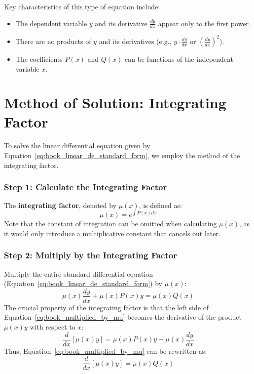 \documentclass[12pt, letterpaper]{book}
\begin{document}
Key characteristics of this type of equation include:
\begin{itemize}
    \item The dependent variable $y$ and its derivative $\frac{dy}{dx}$ appear only to the first power.
    \item There are no products of $y$ and its derivatives (e.g., $y \cdot \frac{dy}{dx}$ or $(\frac{dy}{dx})^2$).
    \item The coefficients $P(x)$ and $Q(x)$ can be functions of the independent variable $x$.
\end{itemize}

\section{Method of Solution: Integrating Factor}
\label{sec:book_integrating_factor}
To solve the linear differential equation given by Equation~\ref{eq:book_linear_de_standard_form}, we employ the method of the integrating factor.

\subsubsection{Step 1: Calculate the Integrating Factor}
The \textbf{integrating factor}, denoted by $\mu(x)$, is defined as:
\begin{equation}
    \mu(x) = e^{\int P(x)dx}
    \label{eq:book_integrating_factor_formula}
\end{equation}
Note that the constant of integration can be omitted when calculating $\mu(x)$, as it would only introduce a multiplicative constant that cancels out later.

\subsubsection{Step 2: Multiply by the Integrating Factor}
Multiply the entire standard differential equation (Equation~\ref{eq:book_linear_de_standard_form}) by $\mu(x)$:
\begin{equation}
    \mu(x)\frac{dy}{dx} + \mu(x)P(x)y = \mu(x)Q(x)
    \label{eq:book_multiplied_by_mu}
\end{equation}
The crucial property of the integrating factor is that the left side of Equation~\ref{eq:book_multiplied_by_mu} becomes the derivative of the product $\mu(x)y$ with respect to $x$:
\begin{equation}
    \frac{d}{dx}[\mu(x)y] = \mu(x)P(x)y + \mu(x)\frac{dy}{dx}
\end{equation}
Thus, Equation~\ref{eq:book_multiplied_by_mu} can be rewritten as:
\begin{equation}
    \frac{d}{dx}[\mu(x)y] = \mu(x)Q(x)
    \label{eq:book_derivative_product_form}
\end{equation}
\end{document}
